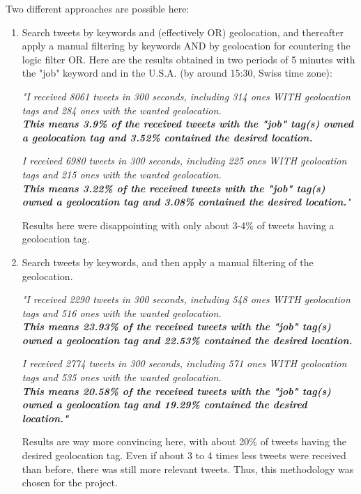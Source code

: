 \documentclass[a4paper,11pt]{report}
\begin{document}
Two different approaches are possible here:
\begin{enumerate}
	\item Search tweets by keywords and (effectively OR) geolocation, and thereafter apply a manual filtering by keywords AND by geolocation for countering the logic filter OR. Here are the results obtained in two periods of 5 minutes with the "job" keyword and in the U.S.A. (by around 15:30, Swiss time zone):
	
	\vspace{5pt}
	\textit{"I received 8061 tweets in 300 seconds, including 314 ones WITH geolocation tags and 284 ones with the wanted geolocation.\\
	\textbf{This means 3.9\% of the received tweets with the "job" tag(s) owned a geolocation tag and 3.52\% contained the desired location.}}
		
	\textit{I received 6980 tweets in 300 seconds, including 225 ones WITH geolocation tags and 215 ones with the wanted geolocation.\\
	\textbf{This means 3.22\% of the received tweets with the "job" tag(s) owned a geolocation tag and 3.08\% contained the desired location.}"}
	\vspace{5pt}
	
	Results here were disappointing with only about 3-4\% of tweets having a geolocation tag.
	
	\item Search tweets by keywords, and then apply a manual filtering of the geolocation.
	
	\vspace{5pt}
	\textit{"I received 2290 tweets in 300 seconds, including 548 ones WITH geolocation tags and 516 ones with the wanted geolocation.\\
	\textbf{This means 23.93\% of the received tweets with the "job" tag(s) owned a geolocation tag and 22.53\% contained the desired location.}}
	
	\textit{I received 2774 tweets in 300 seconds, including 571 ones WITH geolocation tags and 535 ones with the wanted geolocation.\\
	\textbf{This means 20.58\% of the received tweets with the "job" tag(s) owned a geolocation tag and 19.29\% contained the desired location."}}
	\vspace{5pt}
	
	Results are way more convincing here, with about 20\% of tweets having the desired geolocation tag. Even if about 3 to 4 times less tweets were received than before, there was still more relevant tweets. Thus, this methodology was chosen for the project.	
\end{enumerate}
\end{document}
